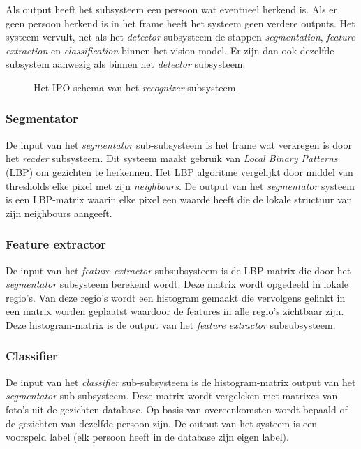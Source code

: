 Als output heeft het subsysteem een persoon wat eventueel herkend is. Als er
geen persoon herkend is in het frame heeft het systeem geen verdere outputs.
Het systeem vervult, net als het \emph{detector} subsysteem de stappen \emph{segmentation},
\emph{feature extraction} en \emph{classification} binnen het vision-model. Er
zijn dan ook dezelfde subsystem aanwezig als binnen het \emph{detector} subsysteem.

\begin{figure}[H]
    \begin{center}
        
    \end{center}
    \caption{Het IPO-schema van het \emph{recognizer} subsysteem}
    \label{fig:ipo-recognizer}
\end{figure}

\subsubsection{Segmentator}

De input van het \emph{segmentator} sub-subsysteem is het frame wat verkregen is
door het \emph{reader} subsysteem. Dit systeem maakt gebruik van \emph{Local
Binary Patterns} (LBP) om gezichten te herkennen. Het LBP algoritme vergelijkt
door middel van thresholds elke pixel met zijn \emph{neighbours}. De output
van het \emph{segmentator} systeem is een LBP-matrix waarin elke pixel een
waarde heeft die de lokale structuur van zijn neighbours aangeeft.

\subsubsection{Feature extractor}

De input van het \emph{feature extractor} subsubsysteem is de LBP-matrix die door
het \emph{segmentator} subsysteem berekend wordt. Deze matrix wordt opgedeeld
in lokale regio's. Van deze regio's wordt een histogram gemaakt die vervolgens
gelinkt in een matrix worden geplaatst waardoor de features in alle regio's
zichtbaar zijn. Deze histogram-matrix is de output van het \emph{feature
extractor} subsubsysteem.

\subsubsection{Classifier}

De input van het \emph{classifier} sub-subsysteem is de histogram-matrix output
van het \emph{segmentator} sub-subsysteem. Deze matrix wordt vergeleken met matrixes
van foto's uit de gezichten database. Op basis van overeenkomsten wordt bepaald
of de gezichten van dezelfde persoon zijn. De output van het systeem is een
voorspeld label (elk persoon heeft in de database zijn eigen label).


